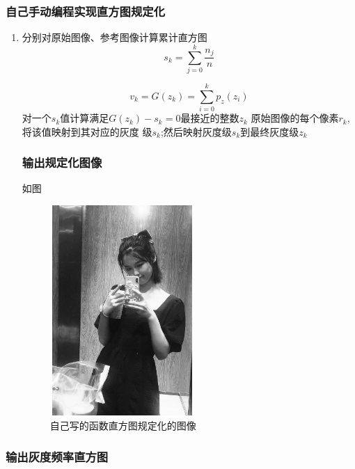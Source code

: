 \documentclass{article}
\begin{document}
  \subsubsection{自己手动编程实现直方图规定化}
  \begin{enumerate}
    \item 分别对原始图像、参考图像计算累计直方图
    $$s_{k}=\sum_{j=0}^{k} \frac{n_{j}}{n}$$

    $$v_{k}=G(z_{k})=\sum_{i=0}^{k} p_{z}(z_i)$$
对一个$s_k$值计算满足$G(z_{k})-s_{k}=0$最接近的整数$z_k$
原始图像的每个像素$r_k$,将该值映射到其对应的灰度
级$s_k$;然后映射灰度级$s_k$到最终灰度级$z_k$

    \subsubsection{输出规定化图像}
    如图
     \begin{figure}[h!]
                \centering
                \includegraphics[width=5.5cm,height=8cm]{xuan12.png}
                \caption{自己写的函数直方图规定化的图像}
                \end{figure}
  \end{enumerate}
   \subsubsection{输出灰度频率直方图}
\end{document}
